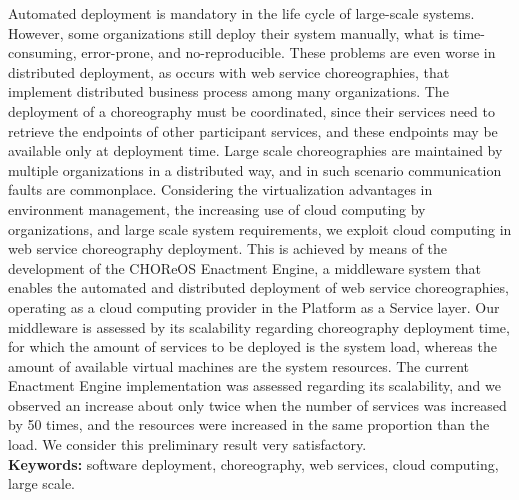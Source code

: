 \documentclass[11pt,twoside,a4paper]{book}
\begin{document}

Automated deployment is mandatory in the life cycle of large-scale systems. However, some organizations still deploy their system manually, what is time-consuming, error-prone, and no-reproducible. These problems are even worse in distributed deployment, as occurs with web service choreographies, that implement distributed business process among many organizations. The deployment of a choreography must be coordinated, since their services need to retrieve the endpoints of other participant services, and these endpoints may be available only at deployment time. Large scale choreographies are maintained by multiple organizations in a distributed way, and in such scenario communication faults are commonplace. Considering the virtualization advantages in environment management,  the increasing use of cloud computing by organizations, and large scale system requirements, we exploit cloud computing in web service choreography deployment. This is achieved by means of the development of the CHOReOS Enactment Engine, a middleware system that enables the automated and distributed deployment of web service choreographies, operating as a cloud computing provider in the Platform as a Service layer. Our middleware is assessed by its scalability regarding choreography deployment time, for which the amount of services to be deployed is the system load, whereas the amount of available virtual machines are the system resources. The current Enactment Engine implementation was assessed regarding its scalability, and we observed an increase about only twice when the number of services was increased by 50 times, and the resources were increased in the same proportion than the load. We consider this preliminary result very satisfactory.
\\

\noindent \textbf{Keywords:} software deployment, choreography, web services, cloud computing, large scale.

\tableofcontents    %

\end{document}
